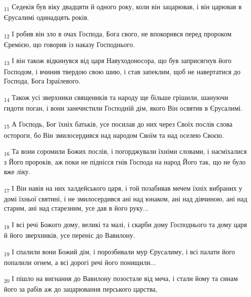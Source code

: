 \begin{tcolorbox}
\textsubscript{11} Седекія був віку двадцяти й одного року, коли він зацарював, і він царював в Єрусалимі одинадцять років.
\end{tcolorbox}
\begin{tcolorbox}
\textsubscript{12} І робив він зло в очах Господа, Бога свого, не впокорився перед пророком Єремією, що говорив із наказу Господнього.
\end{tcolorbox}
\begin{tcolorbox}
\textsubscript{13} І він також відкинувся від царя Навуходоносора, що був заприсягнув його Господом, і вчинив твердою свою шию, і став запеклим, щоб не навертатися до Господа, Бога Ізраїлевого.
\end{tcolorbox}
\begin{tcolorbox}
\textsubscript{14} Також усі зверхники священиків та народу ще більше грішили, шануючи гидоти поган, і вони занечистили Господній дім, якого Він освятив в Єрусалимі.
\end{tcolorbox}
\begin{tcolorbox}
\textsubscript{15} А Господь, Бог їхніх батьків, усе посилав до них через Своїх послів слова остороги, бо Він змилосердився над народом Своїм та над оселею Своєю.
\end{tcolorbox}
\begin{tcolorbox}
\textsubscript{16} Та вони соромили Божих послів, і погорджували їхніми словами, і насміхалися з Його пророків, аж поки не піднісся гнів Господа на народ Його так, що не було вже ліку.
\end{tcolorbox}
\begin{tcolorbox}
\textsubscript{17} І Він навів на них халдейського царя, і той позабивав мечем їхніх вибраних у домі їхньої святині, і не змилосердився ані над юнаком, ані над дівчиною, ані над старим, ані над старезним, усе дав в його руку...
\end{tcolorbox}
\begin{tcolorbox}
\textsubscript{18} І всі речі Божого дому, великі та малі, і скарби дому Господнього та дому царя й його зверхників, усе переніс до Вавилону.
\end{tcolorbox}
\begin{tcolorbox}
\textsubscript{19} І спалили вони Божий дім, і порозбивали мур Єрусалиму, і всі палати його попалили огнем, а всі дорогі речі його понищили...
\end{tcolorbox}
\begin{tcolorbox}
\textsubscript{20} І пішло на вигнання до Вавилону позостале від меча, і стали йому та синам його за рабів аж до зацарювання перського царства,
\end{tcolorbox}

